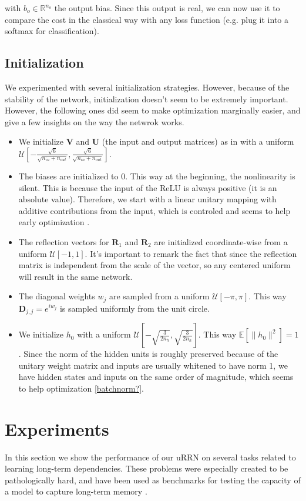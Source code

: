 \documentclass{article} %
\newcommand{\matr}[1]{\mathbf{#1}}
\newcommand\RR{\mathbb{R}}
\begin{document}
with $b_o \in \RR^{n_o}$ the output bias. Since this output is real, we can now use it to compare the cost in the classical way with any loss function (e.g. plug it into a softmax for classification).
\subsection{Initialization}

We experimented with several initialization strategies. However, because of the stability of the network, initialization doesn't seem to be extremely important. However, the following ones did seem to make optimization marginally easier, and give a few insights on the way the netwrok works.

\begin{itemize}
  \item We initialize $\matr{V}$ and $\matr{U}$ (the input and output matrices) as in \cite{Glorotinit} with a uniform $\mathcal{U}\left[-\frac{\sqrt{6}}{\sqrt{n_{in}+ n_{out}}}, \frac{\sqrt{6}}{\sqrt{n_{in}+ n_{out}}}\right]$.
  \item The biases are initialized to 0. This way at the beginning, the nonlinearity is silent. This is because the input of the ReLU is always positive (it is an absolute value). Therefore, we start with a linear unitary mapping with additive contributions from the input, which is controled and seems to help early optimization \citep{Quoc2015}.
  \item The reflection vectors for $\matr{R}_1$ and $\matr{R}_2$ are initialized coordinate-wise from a uniform $\mathcal{U}[-1, 1]$. It's important to remark the fact that since the reflection matrix is independent from the scale of the vector, so any centered uniform will result in the same network.
  \item The diagonal weights $w_j$ are sampled from a uniform $\mathcal{U}[-\pi, \pi]$. This way $\matr{D}_{j,j} = e^{i w_j}$ is sampled uniformly from the unit circle.
  \item We initialize $h_0$ with a uniform $\mathcal{U}\left[-\sqrt{\frac{3}{2n_h}}, \sqrt{\frac{3}{2n_h}} \right]$. This way $\mathbb{E}\left[\|h_0\|^2\right] = 1$. Since the norm of the hidden units is roughly preserved because of the unitary weight matrix and inputs are usually whitened to have norm 1, we have hidden states and inputs on the same order of magnitude, which seems to help optimization \ref{batchnorm?}.
\end{itemize}

\section{Experiments}
In this section we show the performance of our uRRN on several tasks related to learning long-term dependencies. These problems were especially created to be pathologically hard, and have been used as benchmarks for testing the capacity of a model to capture long-term memory \citep{LSTM} \citep{HF} \citep{Quoc2015}.
\end{document}
